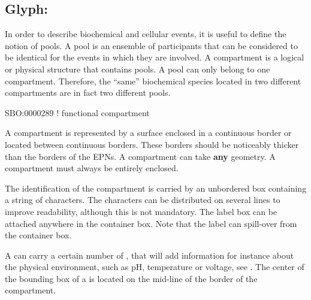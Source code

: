 

\subsection{Glyph: }\label{sec:compartment}

In order to describe biochemical and cellular events, it is useful to define the notion of pools. A pool is an ensemble of participants that  can be considered to be identical for the events in which they are involved. A compartment is a logical or physical structure that contains pools. A pool can only belong to one compartment. Therefore, the ``same'' biochemical species located in two different compartments are in fact two different pools. 

\begin{glyphDescription}

\glyphSboTerm  SBO:0000289 ! functional compartment 

\glyphContainer A compartment is represented by a surface enclosed in a continuous border or located between continuous borders. These borders should be noticeably thicker than the borders of the EPNs. A compartment can take \textbf{any} geometry. A compartment must always be entirely enclosed.

\glyphLabel The identification of the compartment is carried by an unbordered box containing a string of characters. The characters can be distributed on several lines to improve readability, although this is not mandatory. The label box can be attached anywhere in the container box. Note that the label can spill-over from the container box.

\glyphAux A  can carry a certain number of , that will add information for instance about the physical environment, such as pH, temperature or voltage, see .  The center of the bounding box of a  is located on the mid-line of the border of the compartment.

\end{glyphDescription}

